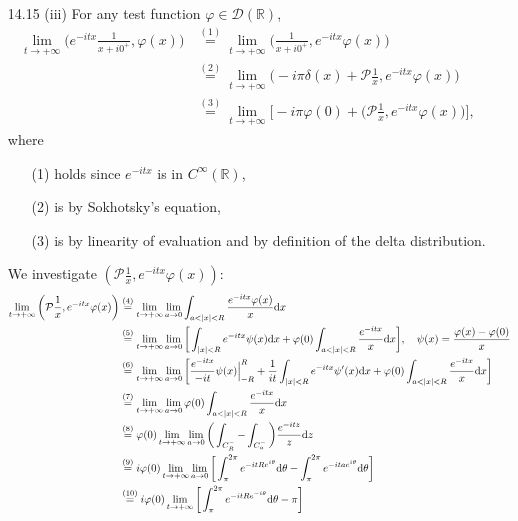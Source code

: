 \documentclass[11pt]{article}
\newcommand{\eq}[1]{\overset{(#1)}{=}}
\begin{document}
\begin{enumerate}
    \hrulefill

    \item[14.15](iii) For any test function $\varphi\in\mathcal{D}(\mathbb{R})$, \begin{align*}
        \lim_{t\to+\infty}\bigg(e^{-itx}\frac{1}{x+i0^+},\varphi(x)\bigg) &\eq{1}\lim_{t\to+\infty} \bigg(\frac{1}{x+i0^+},e^{-itx}\varphi(x)\bigg)\\
        &\eq{2}\lim_{t\to+\infty} \bigg(-i\pi\delta(x)+\mathcal{P}\frac{1}{x}, e^{-itx}\varphi(x)\bigg)\\
        &\eq{3}\lim_{t\to+\infty}\bigg[-i\pi\varphi(0)+ \bigg(\mathcal{P}\frac{1}{x}, e^{-itx}\varphi(x)\bigg)\bigg],
    \end{align*} where \begin{enumerate}
        \item[(1)] holds since $e^{-itx}$ is in $C^\infty(\mathbb{R})$,
        \item[(2)] is by Sokhotsky's equation,
        \item[(3)] is by linearity of evaluation and by definition of the delta distribution. 
    \end{enumerate}
    We investigate $(\mathcal{P}\frac{1}{x}, e^{-itx}\varphi(x))$: \begin{align*}
        \lim_{t\to +\infty}\bigg(\mathcal{P}\frac{1}{x}, e^{-itx}\varphi(x)\bigg) &\eq{4}\lim_{t\to +\infty} \lim_{a\to 0}\int_{a<\abs{x}<R}\frac{e^{-itx}\varphi(x)}{x}\dd x\\
        &\eq{5}\lim_{t\to +\infty} \lim_{a\to 0}\bigg[\int_{\abs{x}<R}e^{-itx}\psi(x)\dd x  + \varphi(0)\int_{a<\abs{x}<R}\frac{e^{-itx}}{x}\dd x\bigg],\quad  \psi(x)= \frac{\varphi(x)-\varphi(0)}{x}\\
        &\eq{6}\lim_{t\to +\infty} \lim_{a\to 0}\bigg[\frac{e^{-itx}}{-it}\psi(x)\Big|_{-R}^R+ \frac{1}{it}\int_{\abs{x}<R}e^{-itx}\psi^\prime(x)\dd x + \varphi(0)\int_{a<\abs{x}<R}\frac{e^{-itx}}{x}\dd x\bigg]\\
        &\eq{7}\lim_{t\to +\infty}\lim_{a\to 0}\varphi(0)\int_{a<\abs{x}<R}\frac{e^{-itx}}{x}\dd x\\
        &\eq{8} \varphi(0)\lim_{t\to +\infty}\lim_{a\to 0}\bigg(\int_{C_R^-}-\int_{C_a^-}\bigg)\frac{e^{-itz}}{z}\dd z\\
        &\eq{9}i\varphi(0)\lim_{t\to +\infty}\lim_{a\to 0}\bigg[\int_\pi^{2\pi} e^{-itRe^{i\theta}}\dd\theta-\int_\pi^{2\pi} e^{-itae^{i\theta}}\dd\theta\bigg]\\
        &\eq{10} i\varphi(0)\lim_{t\to +\infty}\bigg[\int_\pi^{2\pi} e^{-itRe^{-i\theta}}\dd\theta-\pi\bigg]\\

\end{align*}
\end{enumerate}
\end{document}

